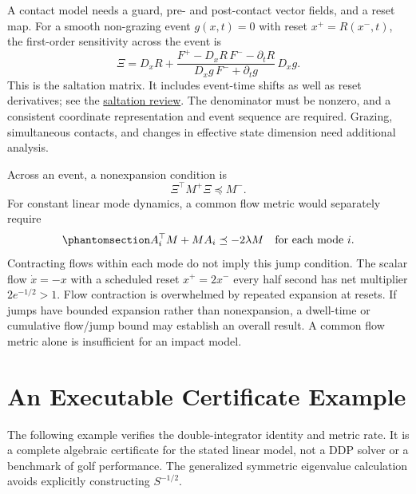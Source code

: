 \documentclass[
  10pt,
  letterpaper,
  DIV=11,
  numbers=noendperiod]{scrartcl}
\begin{document}
A contact model needs a guard, pre- and post-contact vector fields, and
a reset map. For a smooth non-grazing event \(g(x,t)=0\) with reset
\(x^+=R(x^-,t)\), the first-order sensitivity across the event is \[
\Xi=D_xR+
\frac{F^+-D_xR\,F^- -\partial_tR}
{D_xg\,F^-+\partial_tg}\,D_xg.
\] This is the saltation matrix. It includes event-time shifts as well
as reset derivatives; see the
\href{https://arxiv.org/abs/2306.06862}{saltation review}. The
denominator must be nonzero, and a consistent coordinate representation
and event sequence are required. Grazing, simultaneous contacts, and
changes in effective state dimension need additional analysis.

Across an event, a nonexpansion condition is \[
\Xi^\top M^+\Xi\preceq M^-.
\] For constant linear mode dynamics, a common flow metric would
separately require
\begin{equation}\phantomsection\label{eq-common-lyapunov}{
A_i^\top M+MA_i\preceq-2\lambda M\quad\text{for each mode }i.
}\end{equation} Contracting flows within each mode do not imply this
jump condition. The scalar flow \(\dot x=-x\) with a scheduled reset
\(x^+=2x^-\) every half second has net multiplier \(2e^{-1/2}>1\). Flow
contraction is overwhelmed by repeated expansion at resets. If jumps
have bounded expansion rather than nonexpansion, a dwell-time or
cumulative flow/jump bound may establish an overall result. A common
flow metric alone is insufficient for an impact model.

\section{An Executable Certificate
Example}\label{an-executable-certificate-example}

The following example verifies the double-integrator identity and metric
rate. It is a complete algebraic certificate for the stated linear
model, not a DDP solver or a benchmark of golf performance. The
generalized symmetric eigenvalue calculation avoids explicitly
constructing \(S^{-1/2}\).
\end{document}
